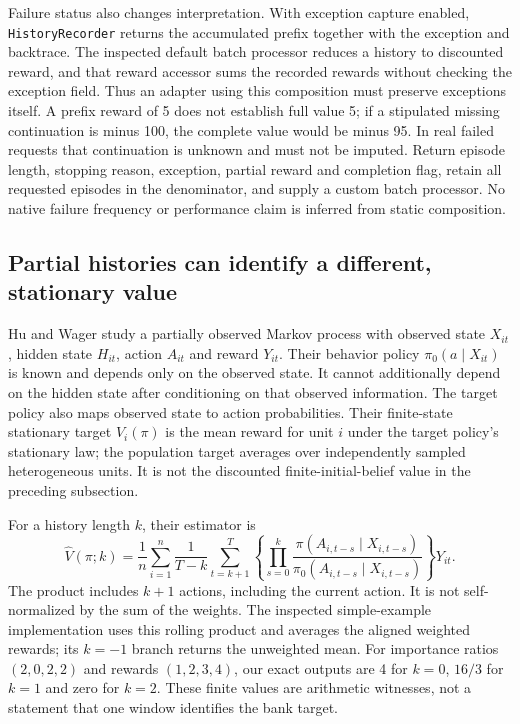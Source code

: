 Failure status also changes interpretation. With exception capture enabled,
\texttt{HistoryRecorder} returns the accumulated prefix together with the
exception and backtrace. The inspected default batch processor reduces a
history to discounted reward, and that reward accessor sums the recorded
rewards without checking the exception field. Thus an adapter using this
composition must preserve exceptions itself. A prefix reward of 5 does not
establish full value 5; if a stipulated missing continuation is minus 100,
the complete value would be minus 95. In real failed requests that continuation
is unknown and must not be imputed. Return episode length, stopping reason,
exception, partial reward and completion flag, retain all requested episodes
in the denominator, and supply a custom batch processor. No native failure
frequency or performance claim is inferred from static composition.
\citep{exec24_policyother_tools,exec24_policyother_contract}

\subsection{Partial histories can identify a different, stationary value}
Hu and Wager study a partially observed Markov process with observed state
$X_{it}$, hidden state $H_{it}$, action $A_{it}$ and reward $Y_{it}$. Their
behavior policy $\pi_0(a\mid X_{it})$ is known and depends only on the observed
state. It cannot additionally depend on the hidden state after conditioning
on that observed information. The target policy also maps observed state to
action probabilities. Their finite-state stationary target $V_i(\pi)$ is the
mean reward for unit $i$ under the target policy's stationary law; the
population target averages over independently sampled heterogeneous units.
It is not the discounted finite-initial-belief value in the preceding subsection.
\citep{exec24_policyother_original}

For a history length $k$, their estimator is
\[
 \widehat V(\pi;k)=\frac1n\sum_{i=1}^n\frac1{T-k}
 \sum_{t=k+1}^{T}\left\{\prod_{s=0}^{k}
 \frac{\pi(A_{i,t-s}\mid X_{i,t-s})}
      {\pi_0(A_{i,t-s}\mid X_{i,t-s})}\right\}Y_{it}.
\]
The product includes $k+1$ actions, including the current action. It is not
self-normalized by the sum of the weights. The inspected simple-example
implementation uses this rolling product and averages the aligned weighted
rewards; its $k=-1$ branch returns the unweighted mean. For importance ratios
$(2,0,2,2)$ and rewards $(1,2,3,4)$, our exact outputs are 4 for $k=0$,
$16/3$ for $k=1$ and zero for $k=2$. These finite values are arithmetic
witnesses, not a statement that one window identifies the bank target.
\citep{exec24_policyother_original,exec24_policyother_ope,exec24_policyother_contract}

